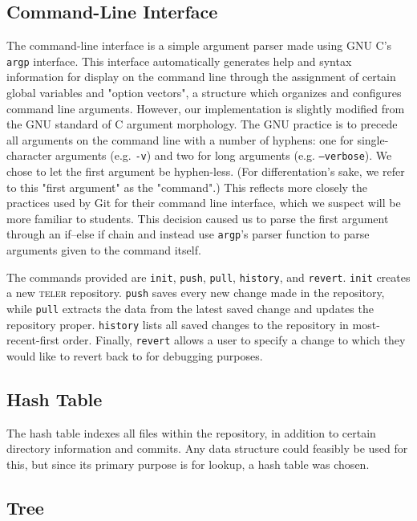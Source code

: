 \documentclass[12pt, letterpaper]{article}
\begin{document}
\subsection{Command-Line Interface}
\label{subsec:cli}

The command-line interface is a simple argument parser made using GNU C's
\texttt{argp} interface. This interface automatically generates help and syntax
information for display on the command line through the assignment of certain
global variables and "option vectors", a structure which organizes and
configures command line arguments. However, our implementation is slightly
modified from the GNU standard of C argument morphology. The GNU practice is to
precede all arguments on the command line with a number of hyphens: one for
single-character arguments (e.g. \texttt{-v}) and two for long arguments (e.g.
\texttt{--verbose}). We chose to let the first argument be hyphen-less. (For
differentation's sake, we refer to this "first argument" as the "command".) This
reflects more closely the practices used by Git for their command line
interface, which we suspect will be more familiar to students. This decision
caused us to parse the first argument through an if--else if chain and instead
use \texttt{argp}'s parser function to parse arguments given to the command
itself.

The commands provided are \texttt{init}, \texttt{push}, \texttt{pull},
\texttt{history}, and \texttt{revert}. \texttt{init} creates a new
\textsc{teler} repository. \texttt{push} saves every new change made in the
repository, while \texttt{pull} extracts the data from the latest saved change
and updates the repository proper. \texttt{history} lists all saved changes to
the repository in most-recent-first order. Finally, \texttt{revert} allows a
user to specify a change to which they would like to revert back to for
debugging purposes.

\subsection{Hash Table}
\label{subsec:hashtable}

The hash table indexes all files within the repository, in addition to certain
directory information and commits. Any data structure could feasibly be used for
this, but since its primary purpose is for lookup, a hash table was chosen.

\subsection{Tree}
\label{subsec:tree}
\end{document}
